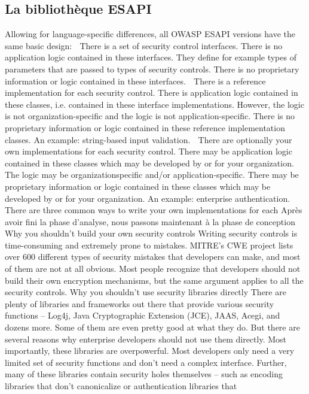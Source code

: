 \subsection{La bibliothèque ESAPI}
Allowing for language-specific differences, all OWASP ESAPI versions have the
same basic design:
 There is a set of security control interfaces. There is no application logic
contained in these interfaces. They define for example types of parameters
that are passed to types of security controls. There is no proprietary
information or logic contained in these interfaces.
 There is a reference implementation for each security control. There is
application logic contained in these classes, i.e. contained in these interface
implementations. However, the logic is not organization-specific and the
logic is not application-specific. There is no proprietary information or
logic contained in these reference implementation classes. An example:
string-based input validation.
 There are optionally your own implementations for each security control.
There may be application logic contained in these classes which may be
developed by or for your organization. The logic may be organizationspecific
and/or application-specific. There may be proprietary
information or logic contained in these classes which may be developed
by or for your organization. An example: enterprise authentication.
There are three common ways to write your own implementations for each 
Après avoir fini la phase d'analyse, nous passons maintenant à la phase de conception
Why you shouldn’t build your own security controls
Writing security controls is time-consuming and extremely prone to mistakes. MITRE’s CWE project lists
over 600 different types of security mistakes that developers can make, and most of them are not at all
obvious. Most people recognize that developers should not build their own encryption mechanisms, but
the same argument applies to all the security controls. 
Why you shouldn’t use security libraries directly
There are plenty of libraries and frameworks out there that provide various security functions – Log4j,
Java Cryptographic Extension (JCE), JAAS, Acegi, and dozens more. Some of them are even pretty good
at what they do. But there are several reasons why enterprise developers should not use them directly.
Most importantly, these libraries are overpowerful. Most developers only need a very limited set of
security functions and don’t need a complex interface. Further, many of these libraries contain security
holes themselves – such as encoding libraries that don’t canonicalize or authentication libraries that
